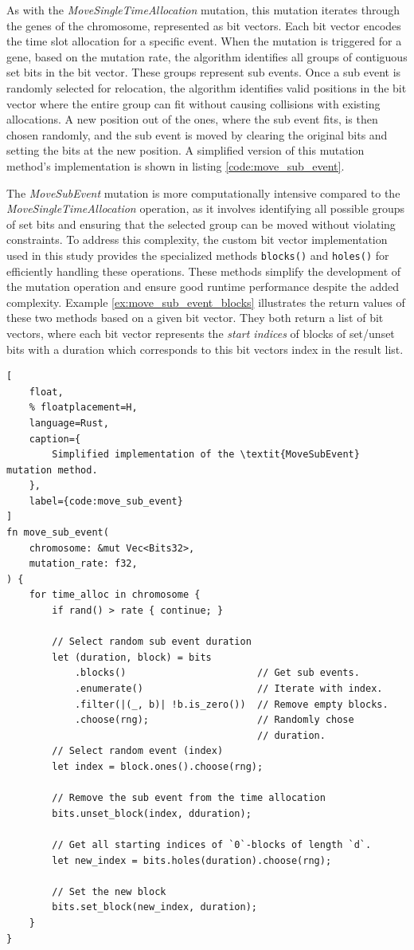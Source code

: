 \documentclass[english,examples]{isasthesis}
\begin{document}
As with the \textit{MoveSingleTimeAllocation} mutation, this mutation iterates
through the genes of the chromosome, represented as bit vectors. Each bit vector
encodes the time slot allocation for a specific event. When the mutation
is triggered for a gene, based on the mutation rate, the algorithm identifies
all groups of contiguous set bits in the bit vector. These groups represent
sub events. Once a sub event is randomly selected for relocation, the algorithm
identifies valid positions in the bit vector where the entire group can fit
without causing collisions with existing allocations. A new position out of the
ones, where the sub event fits, is then chosen randomly, and the sub event is
moved by clearing the original bits and setting the bits at the new position.
A simplified version of this mutation method's implementation is shown in
listing \ref{code:move_sub_event}.

The \textit{MoveSubEvent} mutation is more computationally intensive compared
to the \textit{MoveSingleTimeAllocation} operation, as it involves identifying
all possible groups of set bits and ensuring that the selected group can be
moved without violating constraints. To address this complexity, the custom
bit vector implementation used in this study provides the specialized methods
\lstinline[language=rust]|blocks()| and \lstinline[language=rust]|holes()|
for efficiently handling these operations. These methods simplify the
development of the mutation operation and ensure good runtime performance
despite the added complexity. Example \ref{ex:move_sub_event_blocks}
illustrates the return values of these two methods based on a given
bit vector. They both return a list of bit vectors, where each bit vector
represents the \textit{start indices} of blocks of set/unset bits with a
duration which corresponds to this bit vectors index in the result list.

\begin{lstlisting}[
    float,
    % floatplacement=H,
    language=Rust,
    caption={
        Simplified implementation of the \textit{MoveSubEvent} mutation method.
    },
    label={code:move_sub_event}
]
fn move_sub_event(
    chromosome: &mut Vec<Bits32>,
    mutation_rate: f32,
) {
    for time_alloc in chromosome {
        if rand() > rate { continue; }

        // Select random sub event duration
        let (duration, block) = bits
            .blocks()                       // Get sub events.
            .enumerate()                    // Iterate with index.
            .filter(|(_, b)| !b.is_zero())  // Remove empty blocks.
            .choose(rng);                   // Randomly chose
                                            // duration.
        // Select random event (index)
        let index = block.ones().choose(rng);

        // Remove the sub event from the time allocation
        bits.unset_block(index, dduration);

        // Get all starting indices of `0`-blocks of length `d`.
        let new_index = bits.holes(duration).choose(rng);

        // Set the new block
        bits.set_block(new_index, duration);
    }
}
\end{lstlisting}
\end{document}
